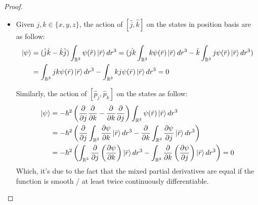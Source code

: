 \documentclass{article}
\begin{document}
\begin{proof}
    
    \hfil

    \begin{itemize}
        \item[(a)] Given $j,k \in \{x,y,z\}$, the action of $[\hat{j},\hat{k}]$ on the states in position basis are as follow:
        \begin{align}
            [\hat{j},\hat{k}]\ket{\psi}&= (\hat{j}\hat{k}-\hat{k}\hat{j})\int_{\RR^3}\psi(\hat{r})\ket{\bar{r}}dr^3 = (\hat{jk}\int_{\RR^3}k\psi(\bar{r})\ket{\bar{r}}dr^3 - \hat{k}\int_{\RR^3}j\psi(\bar{r})\ket{\bar{r}}dr^3)\\
            &= \int_{\RR^3}jk\psi(\bar{r})\ket{\bar{r}}dr^3 - \int_{\RR^3}kj\psi(\bar{r})\ket{\bar{r}}dr^3 = 0
        \end{align}

        Similarly, the action of $[\hat{p}_j, \hat{p}_k]$ on the states as follow:
        \begin{align}
            [\hat{p}_j,\hat{p}_k]\ket{\psi} &= -\hbar^2\left(\frac{\partial}{\partial j}\frac{\partial}{\partial k}-\frac{\partial}{\partial k}\frac{\partial}{\partial j}\right)\int_{\RR^3}\psi(\bar{r})\ket{\bar{r}}dr^3\\
            &= -\hbar^2\left(\frac{\partial}{\partial j}\int_{\RR^3}\frac{\partial \psi}{\partial k}\ket{\bar{r}}dr^3 - \frac{\partial}{\partial k}\int_{\RR^3}\frac{\partial \psi}{\partial j}\ket{\bar{r}}dr^3\right)\\
            &= -\hbar^2\left(\int_{\RR^3}\frac{\partial}{\partial j}\left(\frac{\partial \psi}{\partial k}\right)\ket{\bar{r}}dr^3 - \int_{\RR^3}\frac{\partial}{\partial k}\left(\frac{\partial \psi}{\partial j}\right)\ket{\bar{r}}dr^3\right) = 0
        \end{align}
        Which, it's due to the fact that the mixed partial derivatives are equal if the function is smooth / at least twice continuously differentiable.


\end{itemize}
\end{proof}
\end{document}
